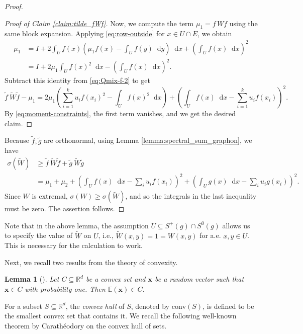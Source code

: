 \documentclass[11pt]{article}
\theoremstyle{plain}
\newtheorem{lemma}[theorem]{Lemma}
\theoremstyle{definition}
\numberwithin{equation}{section}
\newcommand{\dif}{\mathop{}\!\mathrm{d}}
\begin{document}
\begin{proof}
\begin{proof}[Proof of Claim \ref{claim:tilde_fWf}]
Now, we compute the term $\mu_1=f\, Wf$ using the same block expansion. 
Applying \eqref{eq:row-outside} for $x\in U\cap E$, we obtain
\begin{align*}
\mu_1 
& = I + 2\int_U f(x)\left(\mu_1 f(x)-\int_U f(y)\dif{y}\right) \dif{x} + \left(\int_U f(x)\dif{x}\right)^2 \\
& = I + 2\mu_1\int_U f(x)^2 \dif{x} - \left(\int_U f(x) \dif{x}\right)^2.
\end{align*}
Subtract this identity from \eqref{eq:Qmix-f-2} to get
\[
\tilde f\ \widetilde{W}\tilde f -\mu_1
=2\mu_1\left(\sum_{i=1}^k u_i f(x_i)^2 - \int_U f(x)^2 \dif{x} \right)
+\left(\int_U f(x)\dif{x} -\sum_{i=1}^k u_i f(x_i)\right)^2.
\]
By \eqref{eq:moment-constraints}, the first term vanishes, and we get the desired claim. 
\end{proof}

Because $\tilde f,\tilde g$ are orthonormal, using Lemma \ref{lemma:spectral_sum_graphon}, we have
\begin{align*}
\sigma(\widetilde{W})
& \geq \tilde f\ \widetilde{W}\tilde f + \tilde g\ \widetilde{W}\tilde g \\
& = \mu_1+\mu_2 + \left(\int_U f(x) \dif{x} -\sum_i u_i f(x_i)\right)^2 
+ \left(\int_U g(x) \dif{x} -\sum_i u_i g(x_i)\right)^2.
\end{align*}
Since $W$ is extremal, $\sigma(W)\ge \sigma(\widetilde{W})$, and so the integrals in the 
last inequality must be zero. The assertion follows.
\end{proof}

Note that in the above lemma, the assumption $U\subseteq S^+(g)\cap S^0(g)$ allows 
us to specify the value of $\widetilde{W}$ on $U$, i.e., $\widetilde{W}(x,y) = 1 = W(x,y)$ 
for a.e. $x,y\in U$. This is necessary for the calculation to work. 

Next, we recall two results from the theory of convexity. 

\begin{lemma}[{\cite[Section 2.1.4]{Boyd_Vandenberghe_2004}}]\label{lemma:expectation_convex_hull}
Let $C \subseteq \mathbb{R}^d$ be a convex set and $\bm{x}$ be a random vector such that 
$\bm{x} \in C$ with probability one. Then $\mathbb{E}(\bm{x}) \in C$.
\end{lemma}

For a subset $S \subseteq \mathbb{R}^d$, the \emph{convex hull} of $S$, denoted by $\mathrm{conv}(S)$, 
is defined to be the smallest convex set that contains it. We recall the following well-known theorem 
by Carath\'eodory on the convex hull of sets. 
\end{document}
